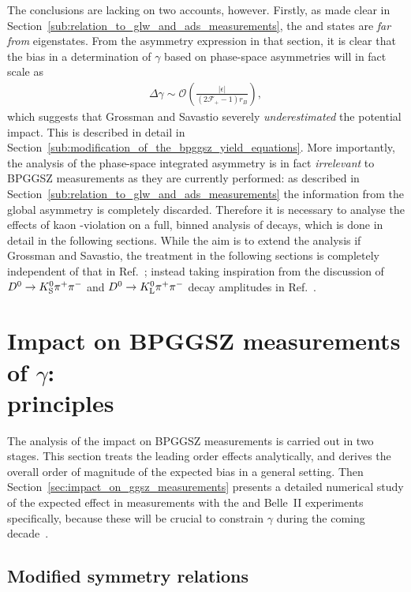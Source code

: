 The conclusions are lacking on two accounts, however. Firstly, as made clear in Section~\ref{sub:relation_to_glw_and_ads_measurements}, the \Kspipi and \KsKK states are \emph{far from} \CP eigenstates. From the asymmetry expression in that section, it is clear that the bias in a determination of $\gamma$ based on phase-space asymmetries will in fact scale as 
\begin{align}
  \Delta \gamma \sim \mathcal O \left(
  \frac{|\epsilon|}
  {(2\mathcal F_+ -1)r_B}
  \right),
\end{align} which suggests that Grossman and Savastio severely \emph{underestimated} the potential impact. This is described in detail in Section~\ref{sub:modification_of_the_bpggsz_yield_equations}. More importantly, the analysis of the phase-space integrated asymmetry is in fact \emph{irrelevant} to BPGGSZ measurements as they are currently performed: as described in Section~\ref{sub:relation_to_glw_and_ads_measurements} the information from the global asymmetry is completely discarded. Therefore it is necessary to analyse the effects of kaon \CP-violation on a full, binned analysis of \DtoKshh decays, which is done in detail in the following sections. While the aim is to extend the analysis if Grossman and Savastio, the treatment in the following sections is completely independent of that in Ref.~\cite{grossmanEffectsBarMixing2014}; instead taking inspiration from the discussion of ${{D}^0}\rightarrow{\ensuremath{{K}^0_{\mathrm{S}}}}{\ensuremath{{\pi}^+}}{\ensuremath{{\pi}^-}}$ and ${{D}^0}\rightarrow{\ensuremath{{K}^0_{\mathrm{L}}}}{\ensuremath{{\pi}^+}}{\ensuremath{{\pi}^-}}$ decay amplitudes in Ref.~\cite{CLEOCISI}.

\section{\texorpdfstring{Impact on BPGGSZ measurements of $\gamma$: \\principles}{Impact on BPGGSZ measurements of gamma: principles}}%
\label{sec:impact_on_}

The analysis of the impact on BPGGSZ measurements is carried out in two stages. This section treats the leading order effects analytically, and derives the overall order of magnitude of the expected bias in a general setting. Then Section~\ref{sec:impact_on_ggsz_measurements} presents a detailed numerical study of the expected effect in measurements with the \lhcb and Belle~II experiments specifically, because these will be crucial to constrain $\gamma$ during the coming decade~\cite{kouBelleIIPhysics2019,lhcbcollaborationPhysicsCaseLHCb2019}. 

\subsection{Modified symmetry relations} %
\label{sub:modified_symmetry_relations}

